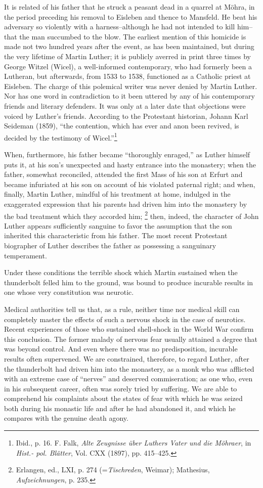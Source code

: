 It is related of his father that he struck a peasant dead in a
quarrel at Möhra, in the period preceding his removal to Eisleben
and thence to Mansfeld. He beat his adversary so violently with
a harness--although he had not intended to kill him--that the
man succumbed to the blow. The earliest mention of this homicide
is made not two hundred years after the event, as has been maintained,
but during the very lifetime of Martin Luther; it is publicly averred
in print three times by George Witzel (Wicel), a well-informed
contemporary, who had formerly been a Lutheran, but afterwards,
from 1533 to 1538, functioned as a Catholic priest at Eisleben. The
charge of this polemical writer was never denied by Martin Luther.
Nor has one word in contradiction to it been uttered by any of his
contemporary friends and literary defenders. It was only at a later
date that objections were voiced by Luther’s friends. According to
the Protestant historian, Johann Karl Seideman (1859), “the contention,
which has ever and anon been revived, is decided by the testimony of Wicel.”\footnote
{Ibid., p. 16. F. Falk, \textit{Alte Zeugnisse über Luthers Vater und die Möhraer}, in \textit{Hist.- pol. Blätter}, Vol. CXX (1897), pp. 415--425.}

When, furthermore, his father became “thoroughly enraged,” as
Luther himself puts it, at his son’s unexpected and hasty entrance
into the monastery; when the father, somewhat reconciled, attended
the first Mass of his son at Erfurt and became infuriated at his
son on account of his violated paternal right; and when, finally,
Martin Luther, mindful of his treatment at home, indulged in the
exaggerated expression that his parents had driven him into the
monastery by the bad treatment which they accorded him;
\footnote{Erlangen, ed., LXI, p. 274 (=\textit{Tischreden}, Weimar); Mathesius, \textit{Aufzeichnungen}, p. 235.}
then, indeed, the character of John Luther appears sufficiently sanguine
to favor the assumption that the son inherited this characteristic
from his father. The most recent Protestant biographer of Luther
describes the father as possessing a sanguinary temperament.

Under these conditions the terrible shock which Martin sustained
when the thunderbolt felled him to the ground, was bound to produce
incurable results in one whose very constitution was neurotic.

Medical authorities tell us that, as a rule, neither time nor medical
skill can completely master the effects of such a nervous shock in
the case of neurotics. Recent experiences of those who sustained
shell-shock in the World War confirm this conclusion. The former
malady of nervous fear usually attained a degree that was beyond
control. And even where there was no predisposition, incurable
results often supervened. We are constrained, therefore, to regard
Luther, after the thunderbolt had driven him into the monastery,
as a monk who was afflicted with an extreme case of “nerves” and
deserved commiseration; as one who, even in his subsequent career,
often was sorely tried by suffering. We are able to comprehend his
complaints about the states of fear with which he was seized both
during his monastic life and after he had abandoned it, and which
he compares with the genuine death agony.

